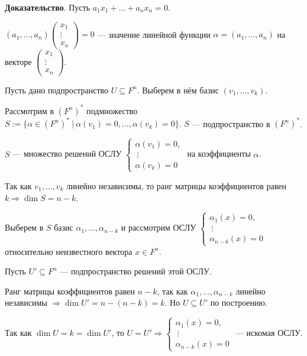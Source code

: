 \documentclass[a4paper, 12pt]{article}
\begin{document}
\textbf{Доказательство}. Пусть $a_1x_1 + \ldots + a_nx_n = 0$.

$(a_1, \ldots, a_n)
\begin{pmatrix}
x_1 \\
\vdots \\
x_n
\end{pmatrix} = 0$ --- значение линейной функции $\alpha = (a_1, \ldots, a_n)$ на векторе $
\begin{pmatrix}
x_1 \\
\vdots \\
x_n
\end{pmatrix}$.

Пусть дано подпространство $U \subseteq F^n$. Выберем в нём базис $(v_1, \ldots, v_k)$.

Рассмотрим в $(F^n)^*$ подмножество $S := \{\alpha \in (F^n)^*\ |\ \alpha(v_1) = 0, \ldots, \alpha(v_k) = 0\}$. $S$ --- подпространство в $(F^n)^*$.

$S$ --- множество решений ОСЛУ $
\begin{cases*}
\alpha(v_1) = 0, \\[-0.5em]
\ \vdots \\[-0.5em]
\alpha(v_k) = 0
\end{cases*}$ на коэффициенты $\alpha$.

Так как $v_1, \ldots, v_k$ линейно независимы, то ранг матрицы коэффициентов равен $k \Longrightarrow \dim S = n - k$.

Выберем в $S$ базис $\alpha_1, \ldots, \alpha_{n - k}$ и рассмотрим ОСЛУ $
\begin{cases*}
\alpha_1(x) = 0, \\[-0.5em]
\ \vdots \\[-0.5em]
\alpha_{n - k}(x) = 0
\end{cases*}$ относительно неизвестного вектора $x \in F^n$.

Пусть $U' \subseteq F^n$ --- подпространство решений этой ОСЛУ.

Ранг матрицы коэффициентов равен $n - k$, так как $\alpha_1, \ldots, \alpha_{n - k}$ линейно независимы $\Longrightarrow \dim U' = n - (n - k) = k$. Но $U \subseteq U'$ по построению.

Так как $\dim U = k = \dim U'$, то $U = U' \Longrightarrow 
\begin{cases*}
\alpha_1(x) = 0, \\[-0.5em]
\ \vdots \\[-0.5em]
\alpha_{n - k}(x) = 0
\end{cases*}$ --- искомая ОСЛУ. 
\end{document}
